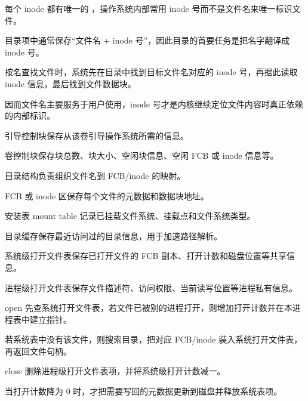 \begin{points}
  \item 每个 inode 都有唯一的 ，操作系统内部常用 inode 号而不是文件名来唯一标识文件。
  \item 目录项中通常保存“文件名 + inode 号”，因此目录的首要任务是把名字翻译成 inode 号。
  \item 按名查找文件时，系统先在目录中找到目标文件名对应的 inode 号，再据此读取 inode 信息，最后找到文件数据块。
  \item 因而文件名主要服务于用户使用，inode 号才是内核继续定位文件内容时真正依赖的内部标识。
\end{points}


\begin{points}
  \item 引导控制块保存从该卷引导操作系统所需的信息。
  \item 卷控制块保存块总数、块大小、空闲块信息、空闲 FCB 或 inode 信息等。
  \item 目录结构负责组织文件名到 FCB/inode 的映射。
  \item FCB 或 inode 区保存每个文件的元数据和数据块地址。
\end{points}


\begin{points}
  \item 安装表 mount table 记录已挂载文件系统、挂载点和文件系统类型。
  \item 目录缓存保存最近访问过的目录信息，用于加速路径解析。
  \item 系统级打开文件表保存已打开文件的 FCB 副本、打开计数和磁盘位置等共享信息。
  \item 进程级打开文件表保存文件描述符、访问权限、当前读写位置等进程私有信息。
\end{points}


\begin{points}
  \item open 先查系统打开文件表，若文件已被别的进程打开，则增加打开计数并在本进程表中建立指针。
  \item 若系统表中没有该文件，则搜索目录，把对应 FCB/inode 装入系统打开文件表，再返回文件句柄。
  \item close 删除进程级打开文件表项，并将系统级打开计数减一。
  \item 当打开计数降为 0 时，才把需要写回的元数据更新到磁盘并释放系统表项。
\end{points}


